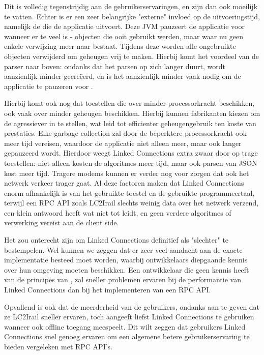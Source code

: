 Dit is volledig tegenstrijdig aan de gebruikerservaringen, en zijn dan ook moeilijk te vatten. Echter is er een zeer belangrijke "externe" invloed op de uitvoeringstijd, namelijk de  die de applicatie uitvoert. Deze JVM pauzeert de applicatie voor  wanneer er te veel  is - objecten die ooit gebruikt werden, maar waar nu geen enkele verwijzing meer naar bestaat. Tijdens deze  worden alle ongebruikte objecten verwijderd om geheugen vrij te maken. Hierbij komt het voordeel van de  parser naar boven: ondanks dat het parsen op zich langer duurt, wordt aanzienlijk minder  gecreëerd, en is het aanzienlijk minder vaak nodig om de applicatie te pauzeren voor .

Hierbij komt ook nog dat toestellen die over minder processorkracht beschikken, ook vaak over minder geheugen beschikken. Hierbij kunnen fabrikanten kiezen om de  agressiever in te stellen, wat leid tot efficienter geheugengebruik ten koste van prestaties. %
Elke garbage collection zal door de beperktere processorkracht ook meer tijd vereisen, waardoor de applicatie niet alleen meer, maar ook langer gepauzeerd wordt. Hierdoor weegt Linked Connections extra zwaar door op trage toestellen: niet alleen kosten de algoritmes meer tijd, maar ook parsen van JSON kost meer tijd. Tragere modems kunnen er verder nog voor zorgen dat ook het netwerk verkeer trager gaat. Al deze factoren maken dat Linked Connections enorm afhankelijk is van het gebruikte toestel en de gebruikte programmeertaal, terwijl een RPC API zoals LC2Irail slechts weinig data over het netwerk verzend, een klein antwoord heeft wat niet tot  leidt, en geen verdere algoritmes of verwerking vereist aan de client side. 

Het zou onterecht zijn om Linked Connections definitief als "slechter" te bestempelen. Wel kunnen we zeggen dat er zeer veel aandacht aan de exacte implementatie besteed moet worden, waarbij ontwikkelaars diepgaande kennis over hun omgeving moeten beschikken. Een ontwikkelaar die geen kennis heeft van de principes van , zal sneller problemen ervaren bij de performantie van Linked Connections dan bij het implementeren van een RPC API.

Opvallend is ook dat de meerderheid van de gebruikers, ondanks aan te geven dat ze LC2Irail sneller ervaren, toch aangeeft liefst Linked Connections te gebruiken wanneer ook offline toegang meespeelt. Dit wilt zeggen dat gebruikers Linked Connections snel genoeg ervaren om een algemene betere gebruikerservaring te bieden vergeleken met RPC API's.